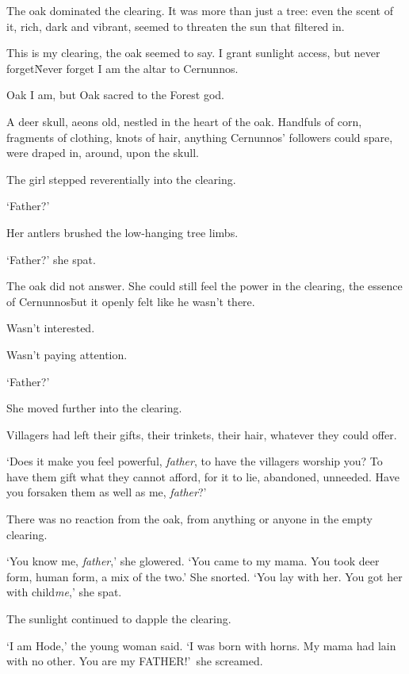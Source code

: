 

\prelude

The oak dominated the clearing. It was more than just a tree: even the
scent of it, rich, dark and vibrant, seemed to threaten the sun that
filtered in.

This is my clearing, the oak seemed to say. I grant sunlight access,
but never forget\=

Never forget I am the altar to Cernunnos.

Oak I am, but Oak sacred to the Forest god.

A deer skull, aeons old, nestled in the heart of the oak. Handfuls of
corn, fragments of clothing, knots of hair, anything Cernunnos'
followers could spare, were draped in, around, upon the skull.

The girl stepped reverentially into the clearing.

`Father?'

\fugue

Her antlers brushed the low-hanging tree limbs.

`Father?' she spat.

The oak did not answer. She could still feel the power in the
clearing, the essence of Cernunnos\=but it openly felt like he wasn't
there.

Wasn't interested.

Wasn't paying attention.

`Father?'

She moved further into the clearing.

Villagers had left their gifts, their trinkets, their hair, whatever
they could offer.

`Does it make you feel powerful, \textit{father}, to have the
villagers worship you? To have them gift what they cannot afford, for
it to lie, abandoned, unneeded. Have you forsaken them as well as me,
\textit{father}?'

There was no reaction from the oak, from anything or anyone in the
empty clearing.

`You know me, \textit{father},' she glowered. `You came to my
mama. You took deer form, human form, a mix of the two.' She
snorted. `You lay with her. You got her with child\=\textit{me},' she
spat.

The sunlight continued to dapple the clearing.

`I am Hode,' the young woman said. `I was born with horns. My mama had
lain with no other. You are my FATHER!'~she screamed.

